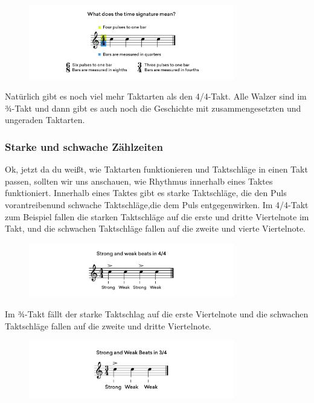 \begin{figure}[H]
    \centering
    \includegraphics[width=0.8\textwidth]{images/Rythm_body}
\end{figure}

Natürlich gibt es noch viel mehr Taktarten als den 4/4-Takt. Alle Walzer sind im ¾-Takt und dann gibt es auch noch die Geschichte mit zusammengesetzten und ungeraden Taktarten.

\subsubsection{Starke und schwache Zählzeiten}
Ok, jetzt da du weißt, wie Taktarten funktionieren und Taktschläge in einen Takt passen, sollten wir uns anschauen, wie Rhythmus innerhalb eines Taktes funktioniert. Innerhalb eines Taktes gibt es starke Taktschläge, die den Puls vorantreibenund schwache Taktschläge,die dem Puls entgegenwirken. Im 4/4-Takt zum Beispiel fallen die starken Taktschläge auf die erste und dritte Viertelnote im Takt, und die schwachen Taktschläge fallen auf die zweite und vierte Viertelnote.

\begin{figure}[H]
    \centering
    \includegraphics[width=0.8\textwidth]{images/Rythm_body_2}
\end{figure}

Im ¾-Takt fällt der starke Taktschlag auf die erste Viertelnote und die schwachen Taktschläge fallen auf die zweite und dritte Viertelnote.

\begin{figure}[H]
    \centering
    \includegraphics[width=0.8\textwidth]{images/Rythm_body_3}
\end{figure}

